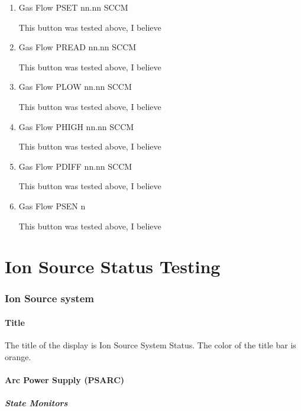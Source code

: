 \documentclass[11pt]{book}		%
\begin{document}
\begin{enumerate}
 \item Gas Flow PSET   nn.nn SCCM

\color{red}
This button was tested above, I believe
\color{black}

 \item Gas Flow PREAD  nn.nn SCCM

\color{red}
This button was tested above, I believe
\color{black}

 \item Gas Flow PLOW   nn.nn SCCM

\color{red}
This button was tested above, I believe
\color{black}

 \item Gas Flow PHIGH  nn.nn SCCM

\color{red}
This button was tested above, I believe
\color{black}

 \item Gas Flow PDIFF  nn.nn SCCM

\color{red}
This button was tested above, I believe
\color{black}

 \item Gas Flow PSEN   n

\color{red}
This button was tested above, I believe
\color{black}

\end{enumerate}



\chapter{Ion Source Status Testing}

\subsection{Ion Source system}

\subsubsection{Title}

The title of the display is Ion Source System Status.  The color of the title bar is orange.

\subsubsection{Arc Power Supply (PSARC)}

\paragraph{State Monitors}
\end{document}
